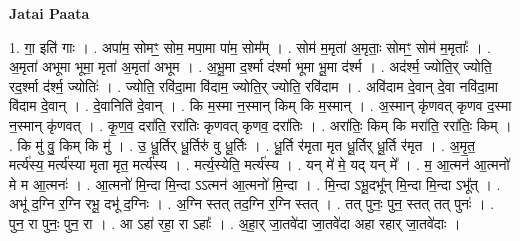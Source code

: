 \documentclass[17pt]{extarticle}
\begin{document}
\textbf{Jatai Paata} \newline

1. गा॒ इति॑ गाः । . अपा॑म॒ सोमꣳ॒॒ सोम॒ मपा॒मा पा॑म॒ सोम᳚म् । . सोम॑ म॒मृता॑ अ॒मृताः॒ सोमꣳ॒॒ सोम॑ म॒मृताः᳚ । . अ॒मृता॑ अभूमा भूमा॒ मृता॑ अ॒मृता॑ अभूम । . अ॒भू॒मा द॒र्श्मा द॑र्श्मा भूमा भू॒मा द॑र्श्म । . अद॑र्श्म॒ ज्योति॒र् ज्योति॒ रद॒र्श्मा द॑र्श्म॒ ज्योतिः॑ । . ज्योति॒ रवि॑दा॒मा वि॑दाम॒ ज्योति॒र् ज्योति॒ रवि॑दाम । . अवि॑दाम दे॒वान् दे॒वा नवि॑दा॒मा वि॑दाम दे॒वान् । . दे॒वानिति॑ दे॒वान् । . कि म॒स्मा न॒स्मान् किम् कि म॒स्मान् । . अ॒स्मान् कृ॑णवत् कृणव द॒स्मा न॒स्मान् कृ॑णवत् । . कृ॒ण॒व॒ दरा॑ति॒ ररा॑तिः कृणवत् कृणव॒ दरा॑तिः । . अरा॑तिः॒ किम् कि मरा॑ति॒ ररा॑तिः॒ किम् । . कि मु॑ वु॒ किम् कि मु॑ । . उ॒ धू॒र्तिर् धू॒र्तिरु॑ वु धू॒र्तिः । . धू॒र्ति र॑मृता मृत धू॒र्तिर् धू॒र्ति र॑मृत । . अ॒मृ॒त॒ मर्त्य॑स्य॒ मर्त्य॑स्या मृता मृत॒ मर्त्य॑स्य । . मर्त्य॒स्येति॒ मर्त्य॑स्य । . यन् मे॑ मे॒ यद् यन् मे᳚ । . म॒ आ॒त्मन॑ आ॒त्मनो॑ मे म आ॒त्मनः॑ । . आ॒त्मनो॑ मि॒न्दा मि॒न्दा ऽऽत्मन॑ आ॒त्मनो॑ मि॒न्दा । . मि॒न्दा ऽभू॒दभू᳚न् मि॒न्दा मि॒न्दा ऽभू᳚त् । . अभू॑ द॒ग्नि र॒ग्नि रभू॒ दभू॑ द॒ग्निः । . अ॒ग्नि स्तत् तद॒ग्नि र॒ग्नि स्तत् । . तत् पुनः॒ पुन॒ स्तत् तत् पुनः॑ । . पुन॒ रा पुनः॒ पुन॒ रा । . आ ऽहा॑ रहा॒ रा ऽहाः᳚ । . अ॒हा॒र् जा॒तवे॑दा जा॒तवे॑दा अहा रहार् जा॒तवे॑दाः । \newline
\end{document}
